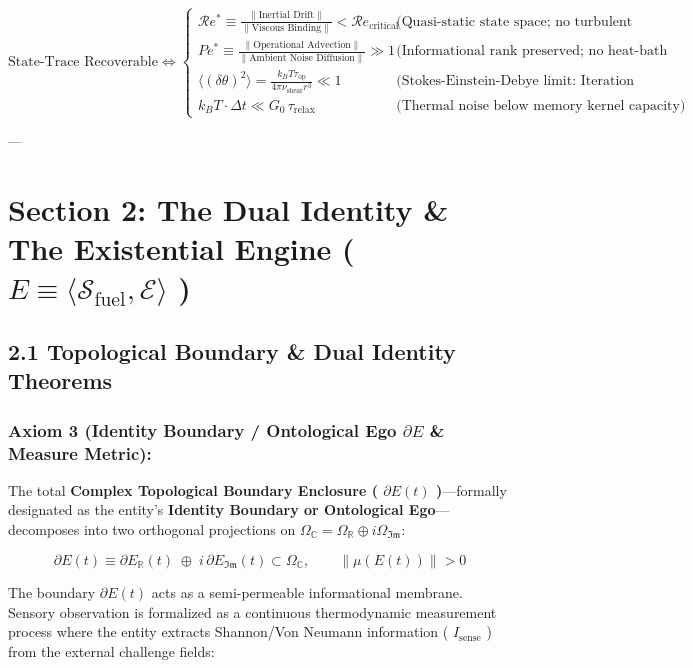 \documentclass[11pt,a4paper]{article}
\theoremstyle{definition}
\theoremstyle{remark}
\begin{document}
\begin{equation}
\text{State-Trace Recoverable} \iff \begin{cases}
\mathcal{R}e^* \equiv \frac{\|\text{Inertial Drift}\|}{\|\text{Viscous Binding}\|} < \mathcal{R}e_{\text{critical}} & \text{(Quasi-static state space; no turbulent scrambling)} \\
Pe^* \equiv \frac{\|\text{Operational Advection}\|}{\|\text{Ambient Noise Diffusion}\|} \gg 1 & \text{(Informational rank preserved; no heat-bath bleed)} \\
\langle(\delta\theta)^2\rangle = \frac{k_B T \tau_{\text{op}}}{4 \pi \nu_{\text{shear}} r^3} \ll 1 & \text{(Stokes-Einstein-Debye limit: Iteration outpaces thermal decoherence)} \\
k_B T \cdot \Delta t \ll G_0 \, \tau_{\text{relax}} & \text{(Thermal noise below memory kernel capacity)}
\end{cases}
\end{equation}


---

\section{Section 2: The Dual Identity \& The Existential Engine ( $E \equiv \langle \mathcal{S}_{\text{fuel}}, \mathcal{E} \rangle$ )}

\subsection{2.1 Topological Boundary \& Dual Identity Theorems}

\subsubsection{Axiom 3 (Identity Boundary / Ontological Ego $\partial E$ \& Measure Metric):}
The total \textbf{Complex Topological Boundary Enclosure ( $\partial E(t)$ )}—formally designated as the entity's \textbf{Identity Boundary or Ontological Ego}—decomposes into two orthogonal projections on $\Omega_{\mathbb{C}} = \Omega_{\mathbb{R}} \oplus i \Omega_{\mathfrak{Im}}$:


\begin{equation}
\boxed{\partial E(t) \equiv \partial E_{\mathbb{R}}(t) \;\oplus\; i \, \partial E_{\mathfrak{Im}}(t) \subset \Omega_{\mathbb{C}}, \qquad \|\mu(E(t))\| > 0}
\end{equation}


The boundary $\partial E(t)$ acts as a semi-permeable informational membrane. Sensory observation is formalized as a continuous thermodynamic measurement process where the entity extracts Shannon/Von Neumann information ( $I_{\text{sense}}$ ) from the external challenge fields:
\end{document}
